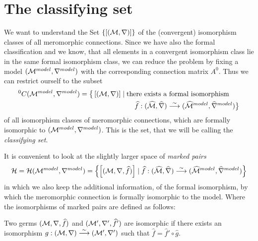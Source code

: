 \section{The classifying set}
We want to understand the Set $\{[(\mathcal{M},\nabla)]\}$ of the (convergent)
isomorphism classes of all meromorphic connections. Since we have also the
formal classification and we know, that all elements in a convergent
isomorphism class lie in the same formal isomorphism class, we can reduce the
problem by fixing a model $(\mathcal{M}^{model},\nabla^{model})$ with the corresponding
connection matrix $A^0$. Thus we can restrict ourself to the subset
\begin{align*}
  {}^0C(\mathcal{M}^{model},\nabla^{model})=\big\{
    \left[(\mathcal{M},\nabla)\right]
    &\mid \text{there exists a formal isomorphism }
  \\&\qquad\widehat f:(\widehat{\mathcal{M}},\widehat\nabla)
      \overset{\sim}\longrightarrow
      (\widehat{\mathcal{M}}^{model},\widehat\nabla^{model})
  \big\}
\end{align*}
of all isomorphism classes of
meromorphic connections, which are formally isomorphic to
$(\mathcal{M}^{model},\nabla^{model})$. This is the set, that we will be calling the
\emph{classifying set}.
\begin{comment}
  \begin{itemize}
    \item \cite{thboalch} p.6
      \begin{itemize}
        \item \cite{boalch} p.19
      \end{itemize}
    \item \cite{Loday1994} p.852
    \item \cite{sabbah2007isomonodromic} p.111
  \end{itemize}
\end{comment}

It is convenient to look at the slightly larger space of \emph{marked pairs}
\[
  \mathcal{H}=\mathcal{H}(\mathcal{M}^{model},\nabla^{model})=\left\{
    \left[(\mathcal{M},\nabla,\widehat f)\right]
      \mid
      \widehat f:(\widehat{\mathcal{M}},\widehat\nabla)
        \overset{\sim}\longrightarrow
        (\widehat{\mathcal{M}}^{model},\widehat\nabla^{model})
  \right\}
\]
in which we also keep the additional information, of the formal isomorphism, by
which the meromorphic connection is formally isomorphic to the model.
Where the isomorphisms of marked pairs are defined as follows:
\begin{defn}
  Two germs $(\mathcal{M},\nabla,\widehat f)$ and $(\mathcal{M}',\nabla',\widehat f')$ are
  isomorphic if there exists an isomorphism
  $g:(\mathcal{M},\nabla)\overset{\sim}\longrightarrow(\mathcal{M}',\nabla')$ such that
  $\hat f=\hat f'\circ \hat g$.
  \begin{comment}
    \cite[111]{sabbah2007isomonodromic}:\dots it is important to remark that
    such an isomorphism is then unique.
  \end{comment}
\end{defn}

